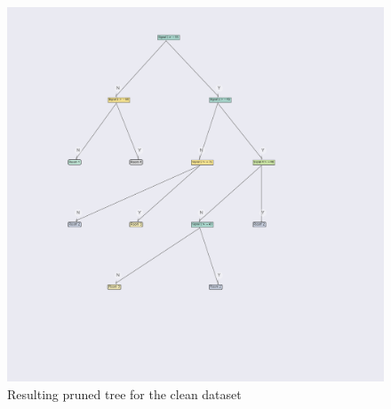 \begin{figure}[H]
    \centering
    \includegraphics[width=\textwidth]{figures/clean_pruned.pdf}
    \caption[Pruned Tree for the Clean Dataset]{Resulting pruned tree for the clean dataset}
      \label{fig:pruning_example_clean_pruned}
\end{figure}
\newpage

